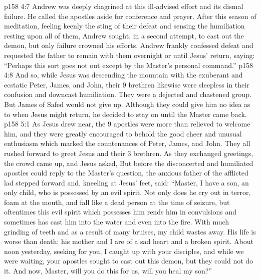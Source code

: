 \vs p158 4:7 Andrew was deeply chagrined at this ill\hyp{}advised effort and its dismal failure. He called the apostles aside for conference and prayer. After this season of meditation, feeling keenly the sting of their defeat and sensing the humiliation resting upon all of them, Andrew sought, in a second attempt, to cast out the demon, but only failure crowned his efforts. Andrew frankly confessed defeat and requested the father to remain with them overnight or until Jesus’ return, saying: “Perhaps this sort goes not out except by the Master’s personal command.”
\vs p158 4:8 And so, while Jesus was descending the mountain with the exuberant and ecstatic Peter, James, and John, their 9 brethren likewise were sleepless in their confusion and downcast humiliation. They were a dejected and chastened group. But James of Safed would not give up. Although they could give him no idea as to when Jesus might return, he decided to stay on until the Master came back.
\vs p158 5:1 As Jesus drew near, the 9 apostles were more than relieved to welcome him, and they were greatly encouraged to behold the good cheer and unusual enthusiasm which marked the countenances of Peter, James, and John. They all rushed forward to greet Jesus and their 3 brethren. As they exchanged greetings, the crowd came up, and Jesus asked,  But before the disconcerted and humiliated apostles could reply to the Master’s question, the anxious father of the afflicted lad stepped forward and, kneeling at Jesus’ feet, said: “Master, I have a son, an only child, who is possessed by an evil spirit. Not only does he cry out in terror, foam at the mouth, and fall like a dead person at the time of seizure, but oftentimes this evil spirit which possesses him rends him in convulsions and sometimes has cast him into the water and even into the fire. With much grinding of teeth and as a result of many bruises, my child wastes away. His life is worse than death; his mother and I are of a sad heart and a broken spirit. About noon yesterday, seeking for you, I caught up with your disciples, and while we were waiting, your apostles sought to cast out this demon, but they could not do it. And now, Master, will you do this for us, will you heal my son?”
